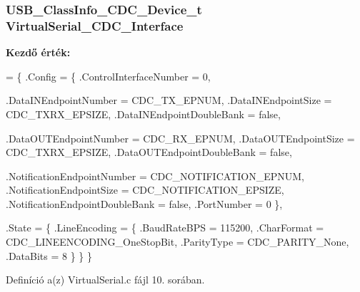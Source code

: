 \subsubsection[{Virtual\-Serial\-\_\-\-C\-D\-C\-\_\-\-Interface}]{\setlength{\rightskip}{0pt plus 5cm}U\-S\-B\-\_\-\-Class\-Info\-\_\-\-C\-D\-C\-\_\-\-Device\-\_\-t Virtual\-Serial\-\_\-\-C\-D\-C\-\_\-\-Interface}\label{_virtual_serial_8c_a6abff48bf476b7a0b5d81012d90058a6}
{\bfseries Kezdő érték\-:}
\begin{DoxyCode}
= \{
    .Config = \{
        .ControlInterfaceNumber         = 0,

        .DataINEndpointNumber           = CDC\_TX\_EPNUM,
        .DataINEndpointSize             = CDC\_TXRX\_EPSIZE,
        .DataINEndpointDoubleBank       = \textcolor{keyword}{false},

        .DataOUTEndpointNumber          = CDC\_RX\_EPNUM,
        .DataOUTEndpointSize            = CDC\_TXRX\_EPSIZE,
        .DataOUTEndpointDoubleBank      = \textcolor{keyword}{false},

        .NotificationEndpointNumber     = CDC\_NOTIFICATION\_EPNUM,
        .NotificationEndpointSize       = CDC\_NOTIFICATION\_EPSIZE,
        .NotificationEndpointDoubleBank = \textcolor{keyword}{false},
        .PortNumber                     = 0
    \},

    .State = \{
        .LineEncoding = \{
                .BaudRateBPS            = 115200,
                .CharFormat             = CDC\_LINEENCODING\_OneStopBit,
                .ParityType             = CDC\_PARITY\_None,
                .DataBits               = 8
        \}
    \}
\}
\end{DoxyCode}


Definíció a(z) Virtual\-Serial.\-c fájl 10. sorában.

